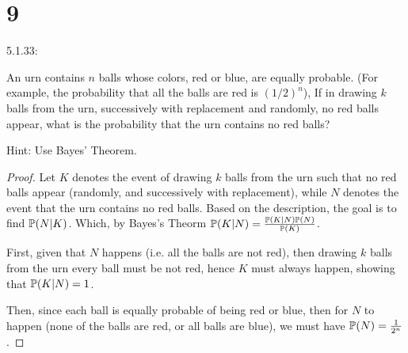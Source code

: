 \documentclass{article}
\begin{document}
\section*{9}
\begin{ques}\label{q9}
    5.1.33:

    An urn contains $n$ balls whose colors, red or blue, are equally probable. (For example, the probability that all the balls are red is $(1/2)^n$), If in drawing $k$ balls from the urn, successively with replacement and randomly, no red balls appear, what is the probability that the urn contains no red balls?

    Hint: Use Bayes' Theorem.
\end{ques}
\begin{proof}
    Let $K$ denotes the event of drawing $k$ balls from the urn such that no red balls appear (randomly, and successively with replacement), while $N$ denotes the event that the urn contains no red balls. Based on the description, the goal is to find $\mathbb{P}(N|K)$. Which, by Bayes's Theorm $\mathbb{P}(K|N)=\frac{\mathbb{P}(K|N)\mathbb{P}(N)}{\mathbb{P}(K)}$.

    \hfil

    First, given that $N$ happens (i.e. all the balls are not red), then drawing $k$ balls from the urn every ball must be not red, hence $K$ must always happen, showing that $\mathbb{P}(K|N)=1$.

    Then, since each ball is equally probable of being red or blue, then for $N$ to happen (none of the balls are red, or all balls are blue), we must have $\mathbb{P}(N)=\frac{1}{2^n}$.


\end{proof}
\end{document}
